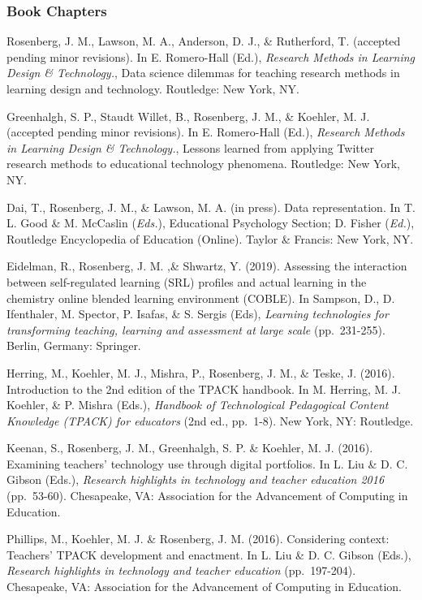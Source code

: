 \documentclass[14,]{article}
\begin{document}
\hypertarget{book-chapters}{%
\subsubsection{Book Chapters}\label{book-chapters}}

Rosenberg, J. M., Lawson, M. A., Anderson, D. J., \& Rutherford, T.
(accepted pending minor revisions). In E. Romero-Hall (Ed.),
\emph{Research Methods in Learning Design \& Technology.}, Data science
dilemmas for teaching research methods in learning design and
technology. Routledge: New York, NY.

Greenhalgh, S. P., Staudt Willet, B., Rosenberg, J. M., \& Koehler, M.
J. (accepted pending minor revisions). In E. Romero-Hall (Ed.),
\emph{Research Methods in Learning Design \& Technology.}, Lessons
learned from applying Twitter research methods to educational technology
phenomena. Routledge: New York, NY.

Dai, T., Rosenberg, J. M., \& Lawson, M. A. (in press). Data
representation. In T. L. Good \& M. McCaslin (\emph{Eds.}), Educational
Psychology Section; D. Fisher (\emph{Ed.}), Routledge Encyclopedia of
Education (Online). Taylor \& Francis: New York, NY.

Eidelman, R., Rosenberg, J. M. ,\& Shwartz, Y. (2019). Assessing the
interaction between self-regulated learning (SRL) profiles and actual
learning in the chemistry online blended learning environment (COBLE).
In Sampson, D., D. Ifenthaler, M. Spector, P. Isafas, \& S. Sergis
(Eds), \emph{Learning technologies for transforming teaching, learning
and assessment at large scale} (pp.~231-255). Berlin, Germany: Springer.

Herring, M., Koehler, M. J., Mishra, P., Rosenberg, J. M., \& Teske, J.
(2016). Introduction to the 2nd edition of the TPACK handbook. In M.
Herring, M. J. Koehler, \& P. Mishra (Eds.), \emph{Handbook of
Technological Pedagogical Content Knowledge (TPACK) for educators} (2nd
ed., pp.~1-8). New York, NY: Routledge.

Keenan, S., Rosenberg, J. M., Greenhalgh, S. P. \& Koehler, M. J.
(2016). Examining teachers' technology use through digital portfolios.
In L. Liu \& D. C. Gibson (Eds.), \emph{Research highlights in
technology and teacher education 2016} (pp.~53-60). Chesapeake, VA:
Association for the Advancement of Computing in Education.

Phillips, M., Koehler, M. J. \& Rosenberg, J. M. (2016). Considering
context: Teachers' TPACK development and enactment. In L. Liu \& D. C.
Gibson (Eds.), \emph{Research highlights in technology and teacher
education} (pp.~197-204). Chesapeake, VA: Association for the
Advancement of Computing in Education.
\end{document}
